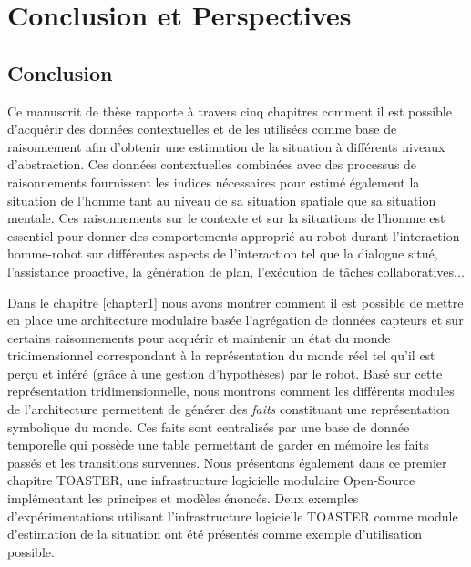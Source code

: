 \documentclass[a4paper,11pt,twoside]{StyleThese}
\begin{document}
\fi


\chapter*{Conclusion et Perspectives}

\section{Conclusion}
Ce manuscrit de thèse rapporte à travers cinq chapitres comment il est possible d'acquérir des données contextuelles et de les utilisées comme base de raisonnement afin d'obtenir une estimation de la situation à différents niveaux d'abstraction. Ces données contextuelles combinées avec des processus de raisonnements fournissent les indices nécessaires pour estimé également la situation de l'homme tant au niveau de sa situation spatiale que sa situation mentale. Ces raisonnements sur le contexte et sur la situations de l'homme est essentiel pour donner des comportements approprié au robot durant l'interaction homme-robot sur différentes aspects de l'interaction tel que la dialogue situé, l'assistance proactive, la génération de plan, l'exécution de tâches collaboratives...

Dans le chapitre \ref{chapter1} nous avons montrer comment il est possible de mettre en place une architecture modulaire basée l'agrégation de données capteurs et sur certains raisonnements pour acquérir et maintenir un état du monde tridimensionnel correspondant à la représentation du monde réel tel qu'il est perçu et inféré (grâce à une gestion d'hypothèses) par le robot. Basé sur cette représentation tridimensionnelle, nous montrons comment les différents modules de l'architecture permettent de générer des \textit{faits} constituant une représentation symbolique du monde. Ces faits sont centralisés par une base de donnée temporelle qui possède une table permettant de garder en mémoire les faits passés et les transitions survenues. Nous présentons également dans ce premier chapitre TOASTER, une infrastructure logicielle modulaire Open-Source implémentant les principes et modèles énoncés.
Deux exemples d'expérimentations utilisant l'infrastructure logicielle TOASTER comme module d'estimation de la situation ont été présentés comme exemple d'utilisation possible.
\end{document}
